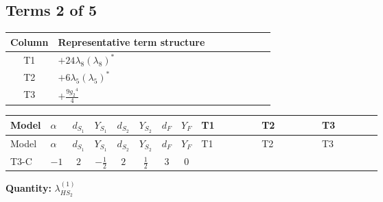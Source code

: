 \documentclass[8pt]{article}
\begin{document}
\begin{landscape}
\subsection*{Terms 2 of 5}
\begin{center}
\begin{tabular}{@{}c >{\raggedright\arraybackslash}p{0.82\linewidth}@{}}
\toprule
Column & Representative term structure \\
\midrule
T1 & \(\displaystyle +24 {\lambda_{8}} \left({\lambda_{8}}\right)^{*}\) \\
\midrule
T2 & \(\displaystyle +6 {\lambda_5} \left({\lambda_5}\right)^{*}\) \\
\midrule
T3 & \(\displaystyle +\frac{9 {g_2}^4}{4}\) \\
\midrule
\bottomrule
\end{tabular}
\end{center}
\smallskip
\tiny
\begin{longtable}{@{}llcccccc >{\raggedright\arraybackslash}p{0.21\linewidth} >{\raggedright\arraybackslash}p{0.21\linewidth} >{\raggedright\arraybackslash}p{0.21\linewidth}@{}}
\toprule
Model & $\alpha$ & $d_{S_1}$ & $Y_{S_1}$ & $d_{S_2}$ & $Y_{S_2}$ & $d_F$ & $Y_F$ & T1 & T2 & T3 \\
\midrule
\endfirsthead
\toprule
Model & $\alpha$ & $d_{S_1}$ & $Y_{S_1}$ & $d_{S_2}$ & $Y_{S_2}$ & $d_F$ & $Y_F$ & T1 & T2 & T3 \\
\midrule
\endhead
T3-C & $-1$ & $2$ & $-\frac{1}{2}$ & $2$ & $\frac{1}{2}$ & $3$ & $0$ & \scriptsize\adjustbox{max width=\linewidth}{$\begin{gathered} +24 {\lambda_{8}} \left({\lambda_{8}}\right)^{*}\end{gathered}$} & \scriptsize\adjustbox{max width=\linewidth}{$\begin{gathered} +6 {\lambda_5} \left({\lambda_5}\right)^{*}\end{gathered}$} & \scriptsize\adjustbox{max width=\linewidth}{$\begin{gathered} +\frac{9 {g_2}^4}{4}\end{gathered}$} \\
\midrule
\bottomrule
\end{longtable}
\clearpage
\noindent\textbf{Quantity: }$\lambda_{HS_2}^{(1)}$\par\smallskip

\end{landscape}
\end{document}
